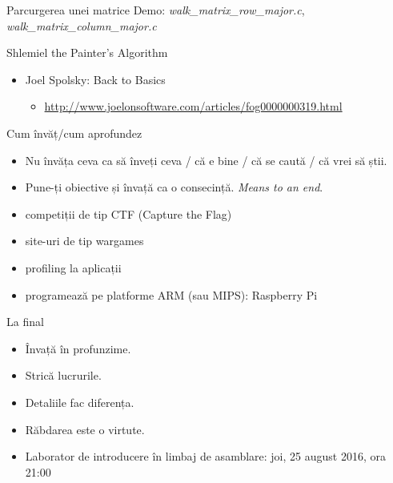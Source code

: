 \documentclass{beamer}
\begin{document}
\begin{frame}{Parcurgerea unei matrice}
  \centering
  Demo: \textit{walk\_matrix\_row\_major.c}, \textit{walk\_matrix\_column\_major.c}
\end{frame}

\begin{frame}{Shlemiel the Painter's Algorithm}
  \begin{itemize}
    \item Joel Spolsky: Back to Basics
      \begin{itemize}
        \item \footnotesize{\url{http://www.joelonsoftware.com/articles/fog0000000319.html}}
      \end{itemize}
  \end{itemize}
\end{frame}

\begin{frame}{Cum învăț/cum aprofundez}
  \begin{itemize}
    \pause \item Nu învăța ceva ca să înveți ceva / că e bine / că se caută / că vrei să știi.
    \pause \item Pune-ți obiective și învață ca o consecință. \textit{Means to an end}.
    \pause \item competiții de tip CTF (Capture the Flag)
    \pause \item site-uri de tip wargames
    \pause \item profiling la aplicații
    \pause \item programează pe platforme ARM (sau MIPS): Raspberry Pi
  \end{itemize}
\end{frame}

\begin{frame}{La final}
  \begin{itemize}
    \pause \item Învață în profunzime.
    \pause \item Strică lucrurile.
    \pause \item Detaliile fac diferența.
    \pause \item Răbdarea este o virtute.
    \pause \item Laborator de introducere în limbaj de asamblare: joi, 25 august 2016, ora 21:00
  \end{itemize}
\end{frame}
\end{document}
